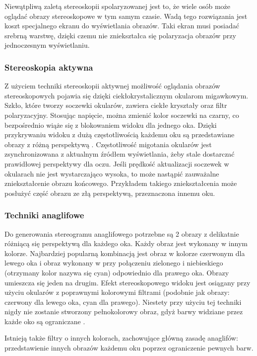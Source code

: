 Niewątpliwą zaletą stereoskopii spolaryzowanej jest to, że wiele osób może oglądać obrazy stereoskopowe w tym samym czasie. Wadą tego rozwiązania jest koszt specjalnego ekranu do wyświetlania obrazów. Taki ekran musi posiadać srebrną warstwę, dzięki czemu nie zniekształca się polaryzacja obrazów przy jednoczesnym wyświetlaniu.

\subsubsection{Stereoskopia aktywna} 
Z użyciem techniki stereoskopii aktywnej możliwość oglądania obrazów stereoskopowych pojawia się dzięki ciekłokrystalicznym okularom migawkowym. Szkło, które tworzy soczewki okularów, zawiera ciekłe kryształy oraz filtr polaryzacyjny. Stosując napięcie, można zmienić kolor soczewki na czarny, co bezpośrednio wiąże się z blokowaniem widoku dla jednego oka. Dzięki przykrywaniu widoku z dużą częstotliwością każdemu oku są przedstawiane obrazy z różną perspektywą \cite{active3d}. Częstotliwość migotania okularów jest zsynchronizowana z aktualnym źródłem wyświetlania, żeby stale dostarczać prawidłowej perspektywy dla oczu. Jeśli prędkość aktualizacji soczewek w okularach nie jest wystarczająco wysoka, to może nastąpić zauważalne zniekształcenie obrazu końcowego. Przykładem takiego zniekształcenia może posłużyć część obrazu ze złą perspektywą, przeznaczona innemu oku.

\subsubsection{Techniki anaglifowe}
Do generowania stereogramu anaglifowego potrzebne są 2 obrazy z delikatnie różniącą się perspektywą dla każdego oka. Każdy obraz jest wykonany w innym kolorze. Najbardziej popularną kombinacją jest obraz w kolorze czerwonym dla lewego oka i obraz wykonany w przy połączeniu zielonego i niebieskiego (otrzymany kolor nazywa się cyan) odpowiednio dla prawego oka. Obrazy umieszcza się jeden na drugim. Efekt stereoskopowego widoku jest osiągany przy użyciu okularów z poprawnymi kolorowymi filtrami (podobnie jak obrazy: czerwony dla lewego oka, cyan dla prawego). Niestety przy użyciu tej techniki nigdy nie zostanie stworzony pełnokolorowy obraz, gdyż barwy widziane przez każde oko są ograniczane \cite{anaglif}. 

Istnieją także filtry o innych kolorach, zachowujące główną zasadę anaglifów: przedstawienie innych obrazów każdemu oku poprzez ograniczenie pewnych barw.


